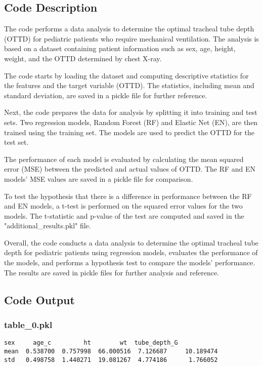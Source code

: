 \documentclass[11pt]{article}
\begin{document}
\subsection{Code Description}

The code performs a data analysis to determine the optimal tracheal tube depth (OTTD) for pediatric patients who require mechanical ventilation. The analysis is based on a dataset containing patient information such as sex, age, height, weight, and the OTTD determined by chest X-ray.

The code starts by loading the dataset and computing descriptive statistics for the features and the target variable (OTTD). The statistics, including mean and standard deviation, are saved in a pickle file for further reference.

Next, the code prepares the data for analysis by splitting it into training and test sets. Two regression models, Random Forest (RF) and Elastic Net (EN), are then trained using the training set. The models are used to predict the OTTD for the test set.

The performance of each model is evaluated by calculating the mean squared error (MSE) between the predicted and actual values of OTTD. The RF and EN models' MSE values are saved in a pickle file for comparison.

To test the hypothesis that there is a difference in performance between the RF and EN models, a t-test is performed on the squared error values for the two models. The t-statistic and p-value of the test are computed and saved in the "additional\_results.pkl" file.

Overall, the code conducts a data analysis to determine the optimal tracheal tube depth for pediatric patients using regression models, evaluates the performance of the models, and performs a hypothesis test to compare the models' performance. The results are saved in pickle files for further analysis and reference.

\subsection{Code Output}

\subsubsection*{table\_0.pkl}

\begin{Verbatim}[tabsize=4]
           sex     age_c         ht        wt  tube_depth_G
mean  0.538700  0.757998  66.000516  7.126687     10.189474
std   0.498758  1.440271  19.081267  4.774186      1.766052
\end{Verbatim}
\end{document}
